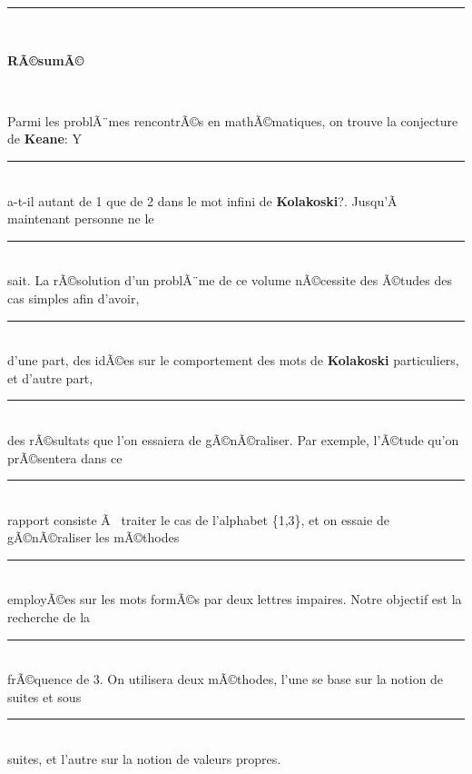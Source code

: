 \documentclass[12pt,a4paper,oneside]{book}
\begin{document}
\rule{1\textwidth}{0pt} \\
     \begin{center}
           {\Huge \textbf{RÃ©sumÃ©}}\\
     \end{center} \\ 
\vspace{10\baselineskip}
\thispagestyle{empty}
\par Parmi les problÃ¨mes rencontrÃ©s en mathÃ©matiques, on trouve la conjecture de \textbf{Keane}: Y 
\rule{1\textwidth}{0pt} \\
 a-t-il autant de 1 que de 2 dans le mot infini de \textbf{Kolakoski}?.  Jusqu'Ã  maintenant personne ne le 
\rule{1\textwidth}{0pt} \\ 
sait. La rÃ©solution d'un problÃ¨me de ce volume nÃ©cessite des Ã©tudes des cas simples afin d'avoir, 
\rule{1\textwidth}{0pt} \\ 
d'une part, des idÃ©es sur le comportement des mots de \textbf{Kolakoski} particuliers, et d'autre part, 
\rule{1\textwidth}{0pt} \\
 des rÃ©sultats que l'on essaiera de gÃ©nÃ©raliser. Par exemple, l'Ã©tude qu'on prÃ©sentera dans ce 
 \rule{1\textwidth}{0pt} \\ 
 rapport consiste Ã  traiter le cas de l'alphabet \{1,3\}, et on essaie de gÃ©nÃ©raliser les mÃ©thodes \rule{1\textwidth}{0pt} \\ 
 employÃ©es sur les mots formÃ©s par deux lettres impaires. Notre objectif est la recherche de la 
\rule{1\textwidth}{0pt} \\
  frÃ©quence de 3. On utilisera deux mÃ©thodes, l'une se base sur la notion de suites et sous 
\rule{1\textwidth}{0pt} \\ 
  suites, et l'autre sur la notion de valeurs propres. 
\tableofcontents
\thispagestyle{empty}
\pagebreak
\end{document}
